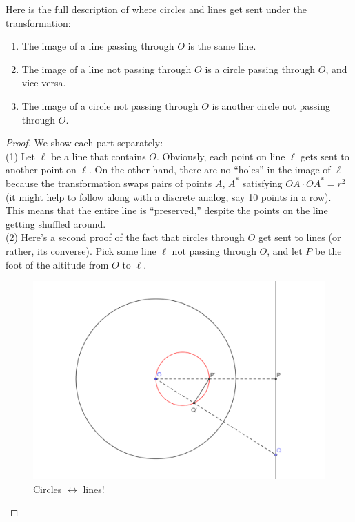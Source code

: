 \documentclass{scrartcl}
\providecommand{\ii}{\item}
\begin{document}
\begin{theorem}
	Here is the full description of where circles and lines get sent
	under the transformation:
	\begin{enumerate}
		\ii The image of a line passing through $O$ is the same line.
		\ii The image of a line not passing through $O$
		is a circle passing through $O$, and vice versa.
		\ii The image of a circle not passing through $O$ is
		another circle not passing through $O$.
	\end{enumerate}
\end{theorem}

\begin{proof} We show each part separately:
\\

(1) Let $\ell$ be a line that contains $O$.
Obviously, each point on line $\ell$ gets sent to another point on $\ell$.
On the other hand, there are no ``holes'' in the image of $\ell$ because
the transformation swaps pairs of points $A$, $A^\ast $ satisfying $OA\cdot OA^\ast  = r^2$
(it might help to follow along with a discrete analog, say 10 points in a row).
This means that the entire line is ``preserved,''
despite the points on the line getting shuffled around.
\\

(2) Here's a second proof of the fact that circles through $O$ get sent to lines
(or rather, its converse).
Pick some line $\ell$ not passing through $O$, and let $P$ be
the foot of the altitude from $O$ to $\ell$. 

\begin{figure}[h]
	\centering
	\includegraphics[width=0.8\linewidth]{inversion_circleToLine}
	\caption{Circles $\leftrightarrow$ lines!}
	\label{fig:inversioncircletoline}
\end{figure}


\end{proof}
\end{document}

